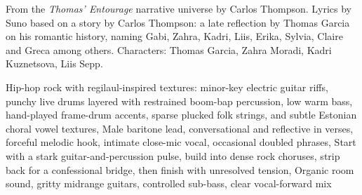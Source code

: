 
\begin{notes}
From the \emph{Thomas' Entourage} narrative universe by Carlos Thompson. Lyrics by Suno based on a story by Carlos Thompson: a late reflection by Thomas Garcia on his romantic history, naming Gabi, Zahra, Kadri, Liis, Erika, Sylvia, Claire and Greca among others. Characters: Thomas Garcia, Zahra Moradi, Kadri Kuznetsova, Liis Sepp.
\end{notes}
\begin{style}
Hip-hop rock with regilaul-inspired textures: minor-key electric guitar riffs, punchy live drums layered with restrained boom-bap percussion, low warm bass, hand-played frame-drum accents, sparse plucked folk strings, and subtle Estonian choral vowel textures, Male baritone lead, conversational and reflective in verses, forceful melodic hook, intimate close-mic vocal, occasional doubled phrases, Start with a stark guitar-and-percussion pulse, build into dense rock choruses, strip back for a confessional bridge, then finish with unresolved tension, Organic room sound, gritty midrange guitars, controlled sub-bass, clear vocal-forward mix
\end{style}
